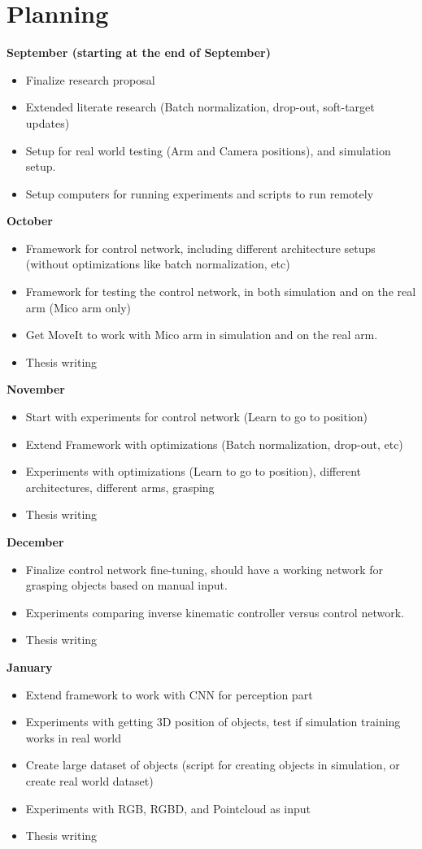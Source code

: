 \section{Planning}

\textbf{September (starting at the end of September)}
\begin{itemize}
  \item Finalize research proposal
  \item Extended literate research (Batch normalization, drop-out, soft-target updates)
  \item Setup for real world testing (Arm and Camera positions), and simulation setup.
  \item Setup computers for running experiments and scripts to run remotely  
\end{itemize} 
\textbf{October}
\begin{itemize}
  \item Framework for control network, including different architecture setups (without optimizations like batch normalization, etc)
  \item Framework for testing the control network, in both simulation and on the real arm (Mico arm only)
  \item Get MoveIt to work with Mico arm in simulation and on the real arm. 
  \item Thesis writing
\end{itemize}
\textbf{November}
\begin{itemize}
  \item Start with experiments for control network (Learn to go to position)
  \item Extend Framework with optimizations (Batch normalization, drop-out, etc)
  \item Experiments with optimizations (Learn to go to position), different architectures, different arms, grasping
  \item Thesis writing
\end{itemize}
\textbf{December}
\begin{itemize}
  \item Finalize control network fine-tuning, should have a working network for grasping objects based on manual input.
  \item Experiments comparing inverse kinematic controller versus control network.
  \item Thesis writing
\end{itemize}
\textbf{January}
\begin{itemize}
  \item Extend framework to work with CNN for perception part
  \item Experiments with getting 3D position of objects, test if simulation training works in real world
  \item Create large dataset of objects (script for creating objects in simulation, or create real world dataset)
  \item Experiments with RGB, RGBD, and Pointcloud as input
  \item Thesis writing
\end{itemize}
